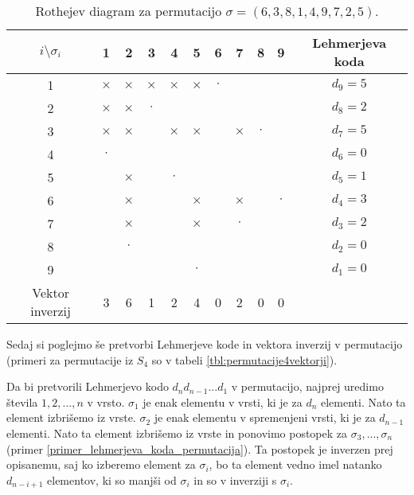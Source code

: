 \documentclass[a4paper, 12pt]{book}
\begin{document}
\begin{table}[h]
    \begin{center}
        \begin{tabular}{ |c|c|c|c|c|c|c|c|c|c|c| } 
        \hline
            $i \setminus \sigma_i$ & 1 & 2 & 3 & 4 & 5 & 6 & 7 & 8 & 9 & Lehmerjeva koda  \\ 
        \hline
            1 & $\times$ & $\times$ & $\times$ & $\times$ & $\times$ & $\cdot$ & & & & $d_9 = 5$  \\ 
        \hline
            2 & $\times$ & $\times$ & $\cdot$ & & & & & & & $d_8 = 2$  \\ 
        \hline
            3 & $\times$ & $\times$ & & $\times$ & $\times$ & & $\times$ & $\cdot$ & & $d_7 = 5$  \\ 
        \hline
            4 & $\cdot$ & & & & & & & & & $d_6 = 0$  \\ 
        \hline
            5 & & $\times$ & & $\cdot$ & & & & & & $d_5 = 1$  \\ 
        \hline
            6 & & $\times$ & & & $\times$ & & $\times$ & & $\cdot$ & $d_4 = 3$  \\ 
        \hline
            7 & & $\times$ & & & $\times$ & & $\cdot$ & & & $d_3 = 2$  \\ 
        \hline
            8 & & $\cdot$ & & & & & & & & $d_2 = 0$  \\ 
        \hline
            9 & & & & & $\cdot$ & & & & & $d_1 = 0$  \\ 
        \hline
            Vektor inverzij & 3 & 6 & 1 & 2 & 4 & 0 & 2 & 0 & 0 &  \\ 
        \hline
        \end{tabular}
    \end{center}
    \caption{ Rothejev diagram za permutacijo $\sigma = (6, 3, 8, 1, 4, 9, 7, 2, 5)$. }
    \label{tbl:rothejev_diagram}
\end{table}

Sedaj si poglejmo še pretvorbi Lehmerjeve kode in vektora inverzij v permutacijo (primeri za permutacije iz $S_4$ so v tabeli \ref{tbl:permutacije4vektorji}).

Da bi pretvorili Lehmerjevo kodo $d_nd_{n-1}...d_1$ v permutacijo, najprej uredimo števila $1, 2, ..., n$ v vrsto. $\sigma_1$ je enak elementu v vrsti, ki je za $d_{n}$ elementi. Nato ta element izbrišemo iz vrste. $\sigma_2$ je enak elementu v spremenjeni vrsti, ki je za $d_{n-1}$ elementi. Nato ta element izbrišemo iz vrste in ponovimo postopek za $\sigma_3, ..., \sigma_n$ (primer \ref{primer_lehmerjeva_koda_permutacija}). Ta postopek je inverzen prej opisanemu, saj ko izberemo element za $\sigma_i$, bo ta element vedno imel natanko $d_{n-i+1}$ elementov, ki so manjši od $\sigma_i$ in so v inverziji s $\sigma_i$.
\end{document}
